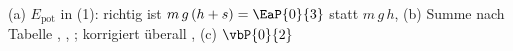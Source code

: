 (a) $E_\mathrm{pot}$ in (1): richtig ist $m\,g\,(h+s) = \EaP{0}{3}$ statt $m\,g\,h$, (b) Summe nach Tabelle , , ; korrigiert überall , (c) $\vbP{0}{2}$
